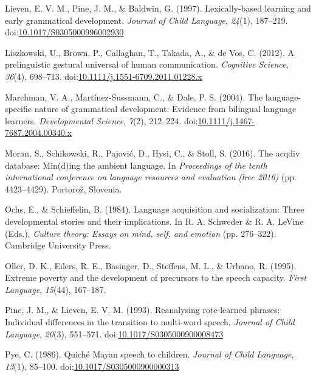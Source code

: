 \documentclass[,man,mask,floatsintext]{apa6}
\begin{document}
\hypertarget{ref-lieven1997lexically}{}
Lieven, E. V. M., Pine, J. M., \& Baldwin, G. (1997). Lexically-based
learning and early grammatical development. \emph{Journal of Child
Language}, \emph{24}(1), 187--219.
doi:\href{https://doi.org/10.1017/S0305000996002930}{10.1017/S0305000996002930}

\hypertarget{ref-liszkowski2012prelinguistic}{}
Liszkowski, U., Brown, P., Callaghan, T., Takada, A., \& de Vos, C.
(2012). A prelinguistic gestural universal of human communication.
\emph{Cognitive Science}, \emph{36}(4), 698--713.
doi:\href{https://doi.org/10.1111/j.1551-6709.2011.01228.x}{10.1111/j.1551-6709.2011.01228.x}

\hypertarget{ref-marchman2004language}{}
Marchman, V. A., Martínez-Sussmann, C., \& Dale, P. S. (2004). The
language-specific nature of grammatical development: Evidence from
bilingual language learners. \emph{Developmental Science}, \emph{7}(2),
212--224.
doi:\href{https://doi.org/10.1111/j.1467-7687.2004.00340.x}{10.1111/j.1467-7687.2004.00340.x}

\hypertarget{ref-moran2016acqdiv}{}
Moran, S., Schikowski, R., Pajović, D., Hysi, C., \& Stoll, S. (2016).
The acqdiv database: Min(d)ing the ambient language. In
\emph{Proceedings of the tenth international conference on language
resources and evaluation (lrec 2016)} (pp. 4423--4429). Portorož,
Slovenia.

\hypertarget{ref-ochs1984language}{}
Ochs, E., \& Schieffelin, B. (1984). Language acquisition and
socialization: Three developmental stories and their implications. In R.
A. Schweder \& R. A. LeVine (Eds.), \emph{Culture theory: Essays on
mind, self, and emotion} (pp. 276--322). Cambridge University Press.

\hypertarget{ref-oller1995extreme}{}
Oller, D. K., Eilers, R. E., Basinger, D., Steffens, M. L., \& Urbano,
R. (1995). Extreme poverty and the development of precursors to the
speech capacity. \emph{First Language}, \emph{15}(44), 167--187.

\hypertarget{ref-pine1993reanalysing}{}
Pine, J. M., \& Lieven, E. V. M. (1993). Reanalysing rote-learned
phrases: Individual differences in the transition to multi-word speech.
\emph{Journal of Child Language}, \emph{20}(3), 551--571.
doi:\href{https://doi.org/10.1017/S0305000900008473}{10.1017/S0305000900008473}

\hypertarget{ref-pye1986quiche}{}
Pye, C. (1986). Quiché Mayan speech to children. \emph{Journal of Child
Language}, \emph{13}(1), 85--100.
doi:\href{https://doi.org/10.1017/S0305000900000313}{10.1017/S0305000900000313}
\end{document}
